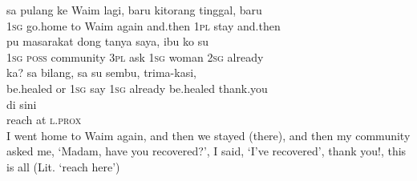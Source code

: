 \ea
\gll   sa    {pulang}    {ke}    {Waim}    {lagi,}    {baru}    {kitorang}    {tinggal,}   baru\\
  \textsc{1sg}    {go.home}    {to}    {Waim}    {again}    {and.then}    {\textsc{1pl}}    {stay}   and.then\\
    {pu}    {masarakat}    {dong}    {tanya}    {saya,}    {ibu}    {ko}    {su}\\
   {\textsc{1sg}}    {\textsc{poss}}    {community}    {\textsc{3pl}}    {ask}    {\textsc{1sg}}    {woman}    {\textsc{2sg}}    {already}\\
    {ka?}    {sa}    {bilang,}    {sa}    {su}    {sembu,}    {trima-kasi,}\\
  {be.healed}    {or}    {\textsc{1sg}}    {say}    {\textsc{1sg}}    {already}    {be.healed}    {thank.you}\\
    {di}    {sini}\\
   {reach}    {at}    {\textsc{l.prox}}\\
\glt
I went home to Waim again, and then we stayed (there), and then my community asked me, ‘Madam, have you recovered?’, I said, ‘I’ve recovered’, thank you!, this is all (Lit. ‘reach here’)
\z %

